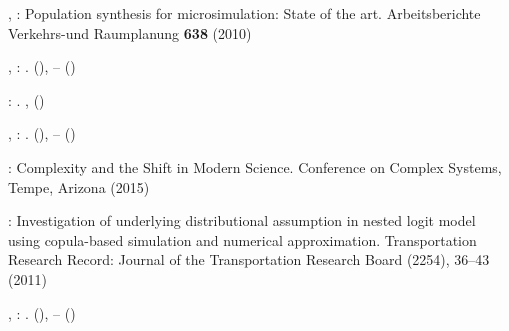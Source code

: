 \documentclass{bmcart}
\begin{document}
\begin{backmatter}
\begin{thebibliography}{59}
\begin{botherref}
,
:
Population synthesis for microsimulation: State of the art.
Arbeitsberichte Verkehrs-und Raumplanung
\textbf{638}
(2010)
\end{botherref}
\endbibitem

\begin{barticle}
,
:
.
(),
--
()
\end{barticle}
\endbibitem

\begin{bbook}
:
.
,
()
\end{bbook}
\endbibitem

\begin{barticle}
,
:
.
(),
--
()
\end{barticle}
\endbibitem

\begin{botherref}
:
Complexity and the Shift in Modern Science.
Conference on Complex Systems, Tempe, Arizona
(2015)
\end{botherref}
\endbibitem

\begin{botherref}
:
Investigation of underlying distributional assumption in nested logit model
  using copula-based simulation and numerical approximation.
Transportation Research Record: Journal of the Transportation Research Board
(2254),
36--43
(2011)
\end{botherref}
\endbibitem

\begin{barticle}
,
:
.
(),
--
()
\end{barticle}
\endbibitem


\end{thebibliography}
\end{backmatter}
\end{document}
